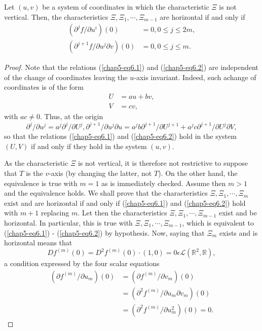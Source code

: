\begin{theorem}\label{chap5-thm6.1}
Let $(u, v)$ be a system of coordinates in which the characteristic $\Xi$ is not vertical. Then, the characteristics $\Xi, \Xi_{1}, \cdots, \Xi_{m-1}$ are horizontal if and only if
\begin{align*}
(\partial^{j}f / \partial u^{i})(0) & = 0, 0 \leq j \leq 2m,\tag{6.1}\label{chap5-eq6.1}\\
(\partial^{j+1}f/\partial u^{j} \partial v) (0) & = 0, 0 \leq j \leq m.\tag{6.2}\label{chap5-eq6.2}
\end{align*}\pageoriginale
\end{theorem}
  
\begin{proof}
Note that the relations (\ref{chap5-eq6.1}) and (\ref{chap5-eq6.2}) are independent of the change of coordinates leaving the $u$-axis invariant. Indeed, such a\break change of coordinates is of the form
\begin{align*}
U & = au + bv,\\
V & = cv,
\end{align*}
with $ac \neq 0$. Thus, at the origin
\begin{equation*}
\partial^{j} / \partial u^{j} = a^{j}\partial^{j} / \partial U^{j},
\partial^{j+1} / \partial u^{j} \partial u = a^{j}b \partial^{j+1}/
\partial U^{j+1} + a^{j}c\partial^{j+1}/ \partial U^j \partial
V,\tag{6.3}\label{chap5-eq6.3} 
\end{equation*}
so that the relations (\ref{chap5-eq6.1}) and (\ref{chap5-eq6.2}) hold in the system $(U, V)$ if and only if they hold in the system $(u, v)$.

As the characteristic $\Xi$ is not vertical, it is therefore not restrictive to suppose that $T$ is the $v$-axis (by changing the latter, not $T$). On the other hand, the equivalence is true with $m = 1$ as is immediately checked. Assume then $m > 1$ and the equivalence holds. We shall prove that the characteristics $\Xi, \Xi_{1}, \cdots, \Xi_{m}$ exist and are horizontal if and only if (\ref{chap5-eq6.1}) and (\ref{chap5-eq6.2}) hold with $m + 1$ replacing $m$. Let then the characteristics $\Xi, \Xi_{1}, \cdots, \Xi_{m-1}$ exist and be horizontal. In particular, this is true with $\Xi, \Xi_{1}, \cdots, \Xi_{m-1}$, which is equivalent to (\ref{chap5-eq6.1}) - (\ref{chap5-eq6.2}) by hypothesis. Now, saying that $\Xi_{m}$ exists and is horizontal means that
$$
Df^{(m)} (0) = D^{2}f^{(m)} (0) \cdot (1, 0) = 0 \epsilon \mathscr{L}(\mathbb{R}^{2}, \mathbb{R}),
$$
a condition expressed by the four scalar equations
\begin{align*} 
(\partial f^{(m)}/ \partial u_{m})(0) &= (\partial f^{(m)} / \partial
  v_{m})(0)\\ 
&= (\partial^{2}f^{(m)} / \partial u_{m} \partial v_{m})(0)\\
&= (\partial^{2}f^{(m)} / \partial u_{m}^{2}) (0) = 0.
\end{align*}


\end{proof}
